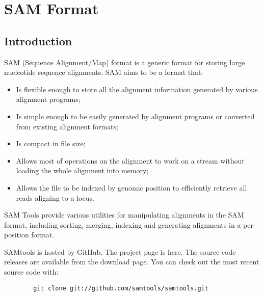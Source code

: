 \chapter{SAM Format}
			\section{Introduction}
			SAM (Sequence Alignment/Map) format is a generic format for storing large nucleotide sequence alignments. SAM aims to be a format that: 
			\begin{itemize}
				\item Is flexible enough to store all the alignment information generated by various alignment programs;
				\item Is simple enough to be easily generated by alignment programs or converted from existing alignment formats;
				\item Is compact in file size;
				\item Allows most of operations on the alignment to work on a stream without loading the whole alignment into memory;
				\item Allows the file to be indexed by genomic position to efficiently retrieve all reads aligning to a locus.
			\end{itemize}
		
		SAM Tools provide various utilities for manipulating alignments in the SAM format, including sorting, merging, indexing and generating alignments in a per-position format.
		
		SAMtools is hosted by GitHub. The project page is here. The source code releases are available from the download page. You can check out the most recent source code with: 
		
		\begin{verbatim}
		git clone git://github.com/samtools/samtools.git
		\end{verbatim}